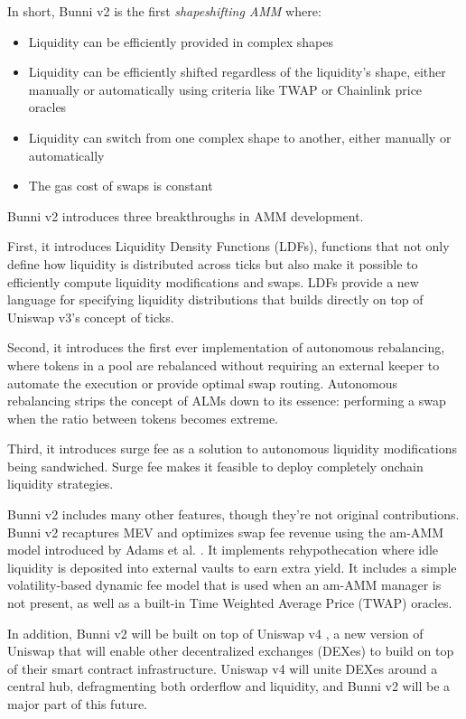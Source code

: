\documentclass[twocolumn]{article}
\begin{document}
In short, Bunni v2 is the first \textit{shapeshifting AMM} where:

\begin{itemize}
  \item Liquidity can be efficiently provided in complex shapes
  \item Liquidity can be efficiently shifted regardless of the liquidity's shape, either manually or automatically using criteria like TWAP or Chainlink price oracles 
  \item Liquidity can switch from one complex shape to another, either manually or automatically
  \item The gas cost of swaps is constant
\end{itemize}

Bunni v2 introduces three breakthroughs in AMM development.

First, it introduces Liquidity Density Functions (LDFs), functions that not only define how liquidity is distributed across ticks but also make it possible to efficiently compute liquidity modifications and swaps. LDFs provide a new language for specifying liquidity distributions that builds directly on top of Uniswap v3's concept of ticks. 

Second, it introduces the first ever implementation of autonomous rebalancing, where tokens in a pool are rebalanced without requiring an external keeper to automate the execution or provide optimal swap routing. Autonomous rebalancing strips the concept of ALMs down to its essence: performing a swap when the ratio between tokens becomes extreme.

Third, it introduces surge fee as a solution to autonomous liquidity modifications being sandwiched. Surge fee makes it feasible to deploy completely onchain liquidity strategies.

Bunni v2 includes many other features, though they're not original contributions. Bunni v2 recaptures MEV and optimizes swap fee revenue using the am-AMM model introduced by Adams et al. \cite{adams2024amamm}. It implements rehypothecation where idle liquidity is deposited into external vaults to earn extra yield. It includes a simple volatility-based dynamic fee model that is used when an am-AMM manager is not present, as well as a built-in Time Weighted Average Price (TWAP) oracles.

In addition, Bunni v2 will be built on top of Uniswap v4 \cite{Adams23}, a new version of Uniswap that will enable other decentralized exchanges (DEXes) to build on top of their smart contract infrastructure. Uniswap v4 will unite DEXes around a central hub, defragmenting both orderflow and liquidity, and Bunni v2 will be a major part of this future.
\end{document}
